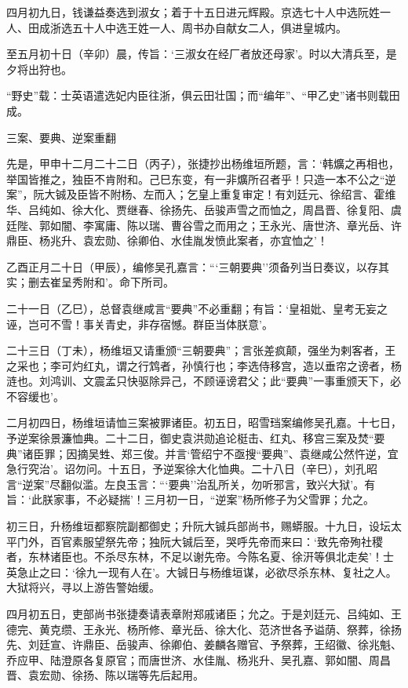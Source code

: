 \documentclass[]{article}
\begin{document}
四月初九日，钱谦益奏选到淑女；着于十五日进元辉殿。京选七十人中选阮姓一人、田成浙选五十人中选王姓一人、周书办自献女二人，俱进皇城内。

至五月初十日（辛卯）晨，传旨：`三淑女在经厂者放还母家'。时以大清兵至，是夕将出狩也。

``野史''载：士英语遣选妃内臣往浙，俱云田壮国；而``编年''、``甲乙史''诸书则载田成。

三案、要典、逆案重翻

先是，甲申十二月二十二日（丙子），张捷抄出杨维垣所题，言：`韩爌之再相也，举国皆推之，独臣不肯附和。己巳东变，有一非爌所召者乎！只造一本不公之``逆案''，阮大铖及臣皆不附杨、左而入；乞皇上重复审定！有刘廷元、徐绍言、霍维华、吕纯如、徐大化、贾继春、徐扬先、岳骏声雪之而恤之，周昌晋、徐复阳、虞廷陛、郭如闇、李寓庸、陈以瑞、曹谷雪之而用之；王永光、唐世济、章光岳、许鼎臣、杨兆升、袁宏勋、徐卿伯、水佳胤发愤此案者，亦宜恤之'！

乙酉正月二十日（甲辰），编修吴孔嘉言：```三朝要典''须备列当日奏议，以存其实；删去崔呈秀附和'。命下所司。

二十一日（乙巳），总督袁继咸言``要典''不必重翻；有旨：`皇祖妣、皇考无妄之诬，岂可不雪！事关青史，非存宿憾。群臣当体朕意'。

二十三日（丁未），杨维垣又请重颁``三朝要典''；言张差疯颠，强坐为剌客者，王之采也；李可灼红丸，谓之行鸩者，孙慎行也；李选侍移宫，造以垂帘之谤者，杨涟也。刘鸿训、文震孟只快驱除异己，不顾诬谤君父；此``要典''一事重颁天下，必不容缓也'。

二月初四日，杨维垣请恤三案被罪诸臣。初五日，昭雪珰案编修吴孔嘉。十七日，予逆案徐景濂恤典。二十二日，御史袁洪勋追论梃击、红丸、移宫三案及焚``要典''诸臣罪；因摘吴甡、郑三俊。并言`管绍宁不亟搜``要典''、袁继咸公然忤逆，宜急行究治'。诏勿问。十五日，予逆案徐大化恤典。二十八日（辛巳），刘孔昭言``逆案''尽翻似滥。左良玉言：```要典''治乱所关，勿听邪言，致兴大狱'。有旨：`此朕家事，不必疑揣'！三月初一日，``逆案''杨所修子为父雪罪；允之。

初三日，升杨维垣都察院副都御史；升阮大铖兵部尚书，赐蟒服。十九日，设坛太平门外，百官素服望祭先帝；独阮大铖后至，哭呼先帝而来曰：`致先帝殉社稷者，东林诸臣也。不杀尽东林，不足以谢先帝。今陈名夏、徐汧等俱北走矣'！士英急止之曰：`徐九一现有人在'。大铖日与杨维垣谋，必欲尽杀东林、复社之人。大狱将兴，寻以上游告警始缓。

四月初五日，吏部尚书张捷奏请表章附郑戚诸臣；允之。于是刘廷元、吕纯如、王德完、黄克缵、王永光、杨所修、章光岳、徐大化、范济世各予谥荫、祭葬，徐扬先、刘廷宣、许鼎臣、岳骏声、徐卿伯、姜麟各赠官、予祭葬，王绍徽、徐兆魁、乔应甲、陆澄原各复原官；而唐世济、水佳胤、杨兆升、吴孔嘉、郭如闇、周昌晋、袁宏勋、徐扬、陈以瑞等先后起用。
\end{document}

